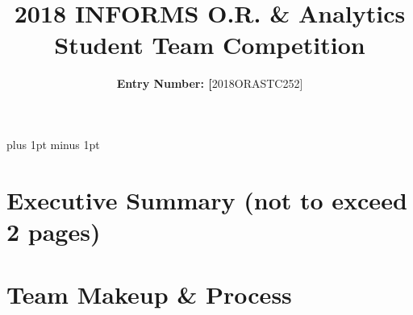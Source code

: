 \documentclass[11pt]{article}
\title{2018 INFORMS O.R. {\&} Analytics Student Team Competition}
\author{\textbf{Entry Number: [}2018ORASTC252]
}
\date{}
\begin{document}
	
	\maketitle
	
	
	\baselineskip16pt plus 1pt minus 1pt
	
	
	
	\section*{Executive Summary (not to exceed 2 pages)}
	
	
	\section*{Team Makeup {\&} Process}
	
\end{document}
